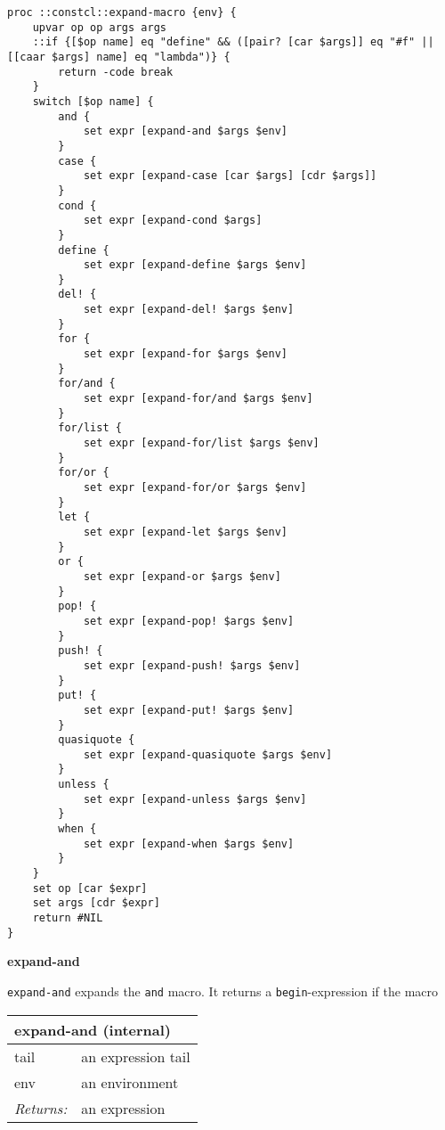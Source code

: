 \documentclass{report}
\begin{document}
\noindent\makebox[\linewidth]{\rule{\linewidth}{0.4pt}}
\begin{lstlisting}
proc ::constcl::expand-macro {env} {
    upvar op op args args
    ::if {[$op name] eq "define" && ([pair? [car $args]] eq "#f" || [[caar $args] name] eq "lambda")} {
        return -code break
    }
    switch [$op name] {
        and {
            set expr [expand-and $args $env]
        }
        case {
            set expr [expand-case [car $args] [cdr $args]]
        }
        cond {
            set expr [expand-cond $args]
        }
        define {
            set expr [expand-define $args $env]
        }
        del! {
            set expr [expand-del! $args $env]
        }
        for {
            set expr [expand-for $args $env]
        }
        for/and {
            set expr [expand-for/and $args $env]
        }
        for/list {
            set expr [expand-for/list $args $env]
        }
        for/or {
            set expr [expand-for/or $args $env]
        }
        let {
            set expr [expand-let $args $env]
        }
        or {
            set expr [expand-or $args $env]
        }
        pop! {
            set expr [expand-pop! $args $env]
        }
        push! {
            set expr [expand-push! $args $env]
        }
        put! {
            set expr [expand-put! $args $env]
        }
        quasiquote {
            set expr [expand-quasiquote $args $env]
        }
        unless {
            set expr [expand-unless $args $env]
        }
        when {
            set expr [expand-when $args $env]
        }
    }
    set op [car $expr]
    set args [cdr $expr]
    return #NIL
}
\end{lstlisting}
\noindent\makebox[\linewidth]{\rule{\linewidth}{0.4pt}}

\textbf{expand-and}


\texttt{expand-and} expands the \texttt{and} macro. It returns a \texttt{begin}-expression if the macro

\begin{tabular}{ |l l| }
\hline
\multicolumn{2}{|l|}{expand-and (internal)} \\
\hline
tail & an expression tail \\
env & an environment \\
\textit{Returns:} & an expression \\
\hline
\end{tabular}
\end{document}
